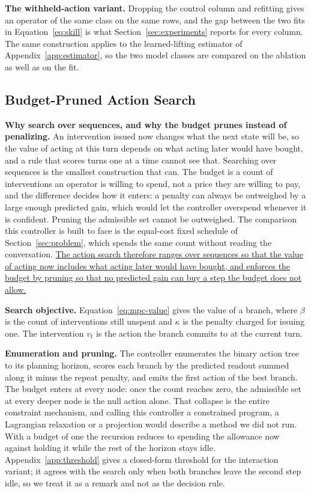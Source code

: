 \textbf{The withheld-action variant.} Dropping the control column and refitting gives an
operator of the same class on the same rows, and the gap between the two fits in
Equation~\eqref{eq:skill} is what Section~\ref{sec:experiments} reports for every column. The
same construction applies to the learned-lifting estimator of Appendix~\ref{app:estimator}, so
the two model classes are compared on the ablation as well as on the fit.

\subsection{Budget-Pruned Action Search}

\textbf{Why search over sequences, and why the budget prunes instead of penalizing.} An
intervention issued now changes what the next state will be, so the value of acting at this
turn depends on what acting later would have bought, and a rule that scores turns one at a time
cannot see that. Searching over sequences is the smallest construction that can. The budget is
a count of interventions an operator is willing to spend, not a price they are willing to pay,
and the difference decides how it enters: a penalty can always be outweighed by a large enough
predicted gain, which would let the controller overspend whenever it is confident. Pruning the
admissible set cannot be outweighed. The comparison this controller is built to face is the
equal-cost fixed schedule of Section~\ref{sec:problem}, which spends the same count without
reading the conversation.
\uline{The action search therefore ranges over sequences so that the value of acting now
includes what acting later would have bought, and enforces the budget by pruning so that no
predicted gain can buy a step the budget does not allow.}

\textbf{Search objective.} Equation~\eqref{eq:mpc-value} gives the value of a branch, where
$\beta$ is the count of interventions still unspent and $\kappa$ is the penalty charged for
issuing one. The intervention $v_t$ is the action the branch commits to at the current turn.

\textbf{Enumeration and pruning.} The controller enumerates the binary action tree to its
planning horizon, scores each branch by the predicted readout summed along it minus the repeat
penalty, and emits the first action of the best branch. The budget enters at every node: once
the count reaches zero, the admissible set at every deeper node is the null action alone. That
collapse is the entire constraint mechanism, and calling this controller a constrained program,
a Lagrangian relaxation or a projection would describe a method we did not run. With a budget of
one the recursion reduces to spending the allowance now against holding it while the rest of the
horizon stays idle. Appendix~\ref{app:threshold} gives a closed-form threshold for the
interaction variant; it agrees with the search only when both branches leave the second step
idle, so we treat it as a remark and not as the decision rule.

